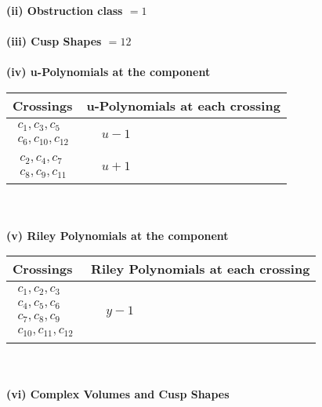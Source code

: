 \documentclass[1p]{elsarticle_modified}
\theoremstyle{definition}
\begin{document}
\flushleft \textbf{(ii) Obstruction class $= 1$}\\~\\
\flushleft \textbf{(iii) Cusp Shapes $= 12$}\\~\\
\newpage\renewcommand{\arraystretch}{1}
\flushleft \textbf{(iv) u-Polynomials at the component}\newline \\
\begin{tabular}{m{50pt}|m{274pt}}
Crossings & \hspace{64pt}u-Polynomials at each crossing \\
\hline $$\begin{aligned}c_{1},c_{3},c_{5}\\c_{6},c_{10},c_{12}\end{aligned}$$&$\begin{aligned}
&u-1
\end{aligned}$\\
\hline $$\begin{aligned}c_{2},c_{4},c_{7}\\c_{8},c_{9},c_{11}\end{aligned}$$&$\begin{aligned}
&u+1
\end{aligned}$\\
\hline
\end{tabular}\\~\\
\newpage\renewcommand{\arraystretch}{1}
\flushleft \textbf{(v) Riley Polynomials at the component}\newline \\
\begin{tabular}{m{50pt}|m{274pt}}
Crossings & \hspace{64pt}Riley Polynomials at each crossing \\
\hline $$\begin{aligned}c_{1},c_{2},c_{3}\\c_{4},c_{5},c_{6}\\c_{7},c_{8},c_{9}\\c_{10},c_{11},c_{12}\end{aligned}$$&$\begin{aligned}
&y-1
\end{aligned}$\\
\hline
\end{tabular}\\~\\
\newpage\flushleft \textbf{(vi) Complex Volumes and Cusp Shapes}
\end{document}
